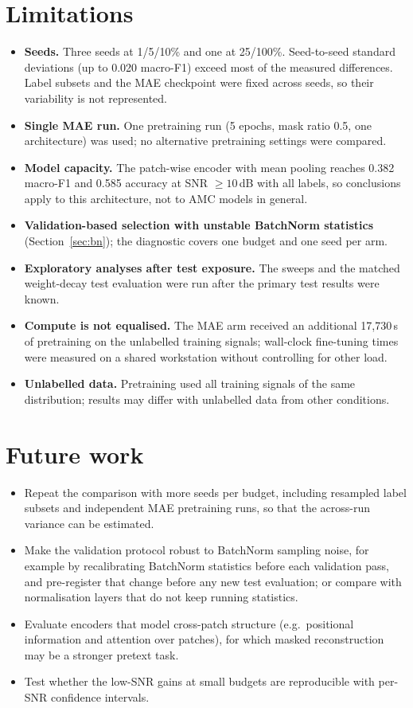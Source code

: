 \documentclass[11pt,a4paper]{article}
\begin{document}
\section{Limitations}\label{sec:limitations}
\begin{itemize}
\item \textbf{Seeds.} Three seeds at 1/5/10\% and one at 25/100\%. Seed-to-seed standard deviations (up to 0.020 macro-F1) exceed most of the measured differences. Label subsets and the MAE checkpoint were fixed across seeds, so their variability is not represented.
\item \textbf{Single MAE run.} One pretraining run (5 epochs, mask ratio 0.5, one architecture) was used; no alternative pretraining settings were compared.
\item \textbf{Model capacity.} The patch-wise encoder with mean pooling reaches 0.382 macro-F1 and 0.585 accuracy at SNR $\ge10$\,dB with all labels, so conclusions apply to this architecture, not to AMC models in general.
\item \textbf{Validation-based selection with unstable BatchNorm statistics} (Section~\ref{sec:bn}); the diagnostic covers one budget and one seed per arm.
\item \textbf{Exploratory analyses after test exposure.} The sweeps and the matched weight-decay test evaluation were run after the primary test results were known.
\item \textbf{Compute is not equalised.} The MAE arm received an additional 17,730\,s of pretraining on the unlabelled training signals; wall-clock fine-tuning times were measured on a shared workstation without controlling for other load.
\item \textbf{Unlabelled data.} Pretraining used all training signals of the same distribution; results may differ with unlabelled data from other conditions.
\end{itemize}

\section{Future work}
\begin{itemize}
\item Repeat the comparison with more seeds per budget, including resampled label subsets and independent MAE pretraining runs, so that the across-run variance can be estimated.
\item Make the validation protocol robust to BatchNorm sampling noise, for example by recalibrating BatchNorm statistics before each validation pass, and pre-register that change before any new test evaluation; or compare with normalisation layers that do not keep running statistics.
\item Evaluate encoders that model cross-patch structure (e.g.\ positional information and attention over patches), for which masked reconstruction may be a stronger pretext task.
\item Test whether the low-SNR gains at small budgets are reproducible with per-SNR confidence intervals.
\end{itemize}
\end{document}
